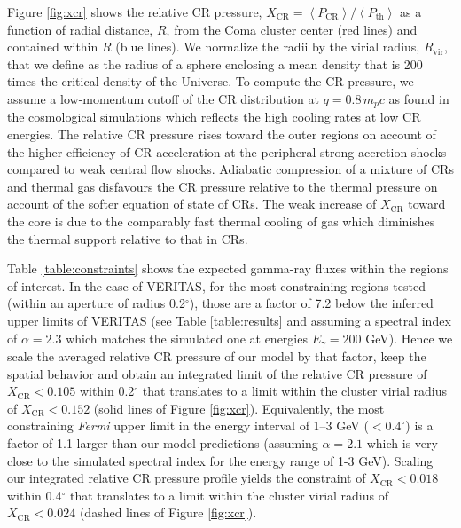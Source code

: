 \documentclass[12pt,manuscript]{aastex}
\newcommand{\expval}[1]{\left\langle #1 \right\rangle}
\newcommand{\rmn}{\mathrm}
\newcommand{\CR}{\mathrm{CR}}
\begin{document}
Figure \ref{fig:xcr} shows the relative CR pressure,
$X_{\CR} = \expval{P_{\CR}}/\expval{P_\rmn{th}}$ as a function of radial distance, $R$, from the
Coma cluster center (red lines) and contained within $R$ (blue lines).  We normalize the radii by
the virial radius, $R_\rmn{vir}$, that we define as the radius of a sphere enclosing a mean density
that is 200 times the critical density of the Universe.  To compute the CR pressure, we assume a
low-momentum cutoff of the CR distribution at $q = 0.8\,m_p c$ as found in the cosmological
simulations which reflects the high cooling rates at low CR energies. The relative CR pressure
rises toward the outer regions on account of the higher efficiency of CR acceleration at the
peripheral strong accretion shocks compared to weak central flow shocks. Adiabatic compression of a
mixture of CRs and thermal gas disfavours the CR pressure relative to the thermal pressure on
account of the softer equation of state of CRs. The weak increase of $X_{\CR}$ toward the core is
due to the comparably fast thermal cooling of gas which diminishes the thermal support relative to
that in CRs.

Table \ref{table:constraints} shows the expected gamma-ray fluxes within the regions of interest.
In the case of VERITAS, for the most constraining regions tested (within an aperture of radius
0.2$^{\circ}$), those are a factor of 7.2 below the inferred upper limits of VERITAS (see Table
\ref{table:results} and assuming a spectral index of $\alpha=2.3$ which matches the simulated one
at energies $E_\gamma=200$ GeV). Hence we scale the averaged relative CR pressure of our model by
that factor, keep the spatial behavior and obtain an integrated limit of the relative CR pressure
of $X_{\CR}<0.105$ within 0.2$^{\circ}$ that translates to a limit within the cluster virial radius
of $X_\CR<0.152$ (solid lines of Figure \ref{fig:xcr}). Equivalently, the most constraining
{\em Fermi} upper limit in the energy interval of 1--3 GeV ($<0.4^\circ$) is a factor of 1.1 larger
than our model predictions (assuming $\alpha=2.1$ which is very close to the simulated spectral
index for the energy range of 1-3 GeV). Scaling our integrated relative CR pressure profile yields
the constraint of $X_{\CR}<0.018$ within 0.4$^{\circ}$ that translates to a limit within the
cluster virial radius of $X_\CR<0.024$ (dashed lines of Figure \ref{fig:xcr}).

%
%
\end{document}
